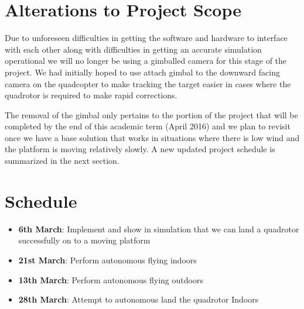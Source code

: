 \documentclass{article}[12pt]
\begin{document}
\section*{Alterations to Project Scope}
Due to unforeseen difficulties in getting the software and hardware to interface with each other along with difficulties in getting an accurate simulation operational we will no longer be using a gimballed camera for this stage of the project. We had initially hoped to use attach gimbal to the downward facing camera on the quadcopter to make tracking the target easier in cases where the quadrotor is required to make rapid corrections.

The removal of the gimbal only pertains to the portion of the project that will be completed by the end of this academic term (April 2016) and we plan to revisit once we have a base solution that works in situations where there is low wind and the platform is moving relatively slowly. A new updated project schedule is summarized in the next section.

\section*{Schedule}

\begin{itemize}
	\vspace{-0.2cm}
	\setlength{\itemsep}{5pt}
	\setlength{\parskip}{0pt}
	\setlength{\parsep}{0pt}
	
	\item{\textbf{6th March}: Implement and show in simulation that we can land 
	a quadrotor successfully on to a moving platform}
	\item{\textbf{21st March}: Perform autonomous flying indoors}
	\item{\textbf{13th March}: Perform autonomous flying outdoors}
	\item{\textbf{28th March}: Attempt to autonomous land the quadrotor Indoors}
\end{itemize}






{}

\end{document}
